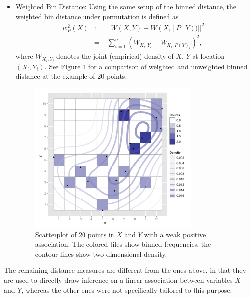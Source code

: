 \begin{itemize}
\item Weighted Bin Distance: Using the same setup of the binned distance, the weighted bin distance under permutation is defined as 
\begin{eqnarray*}
w_P^2(X) &:=&||W(X,Y) - W(X,[P]Y))||^2 \\ &=& \sum_{i=1}^n (W_{X_{i},Y_i} - W_{X_i,P(Y)_i})^2 , 
\end{eqnarray*}
where $W_{X_i,Y_i}$ denotes the joint (empirical) density of $X$, $Y$ at location $(X_i, Y_i)$. See Figure \ref{wbdist} for a comparison of weighted and unweighted binned distance at the example of 20  points.


\begin{figure}[hbt]
   \centering
       \includegraphics[width=3.3in]{wbdist.pdf}
	\vspace{-.2in}
       \caption{Scatterplot of 20 points in $X$ and $Y$ with a weak positive association. The colored tiles show binned frequencies, the contour lines show two-dimensional density.}
       \label{wbdist}
\end{figure}
\end{itemize}

The remaining distance measures are different from the ones above, in that they are used to directly draw inference on a linear association between variables $X$ and $Y$, whereas the other ones were not specifically tailored to this purpose.


